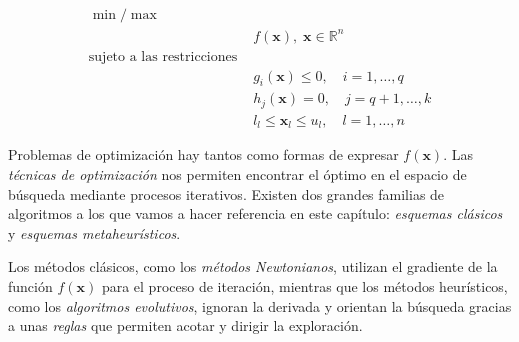 \documentclass[12pt,a4paper]{book}
\begin{document}
\begin{align}
\min / \max \, \nonumber                               & \\ 
                                                                            & f(\mathbf{x}),  \; \mathbf{x} \in \mathbb{R}^n \nonumber \\
\text{sujeto a las restricciones } \nonumber & \\  
                                                                             & g_i(\mathbf{x}) \leq 0, \quad i = 1, \ldots, q \nonumber \\
                                                                             & h_j(\mathbf{x}) = 0, \quad j = q + 1, \ldots, k \nonumber \\
                                                                             & l_l \leq \mathbf{x}_l \leq u_l, \quad l = 1, \ldots, n \label{COPs}
\end{align}


%

Problemas de optimización hay tantos como formas de expresar $f(\mathbf{x})$. Las \textsl{técnicas de optimización} nos permiten encontrar el óptimo en el espacio de búsqueda mediante procesos iterativos. Existen dos grandes familias de algoritmos a los que vamos a hacer referencia en este capítulo: \textsl{esquemas clásicos} y \textsl{esquemas metaheurísticos}. 

Los métodos clásicos, como los \textsl{métodos Newtonianos}, utilizan el gradiente de la función $f(\mathbf{x})$ para el proceso de iteración, mientras que los métodos heurísticos, como los \textsl{algoritmos evolutivos}, ignoran la derivada y orientan la búsqueda gracias a unas \textsl{reglas} que permiten acotar y dirigir la exploración.  


\end{document}
